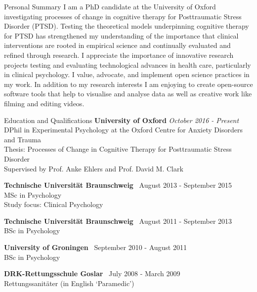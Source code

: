 \documentclass{resume} %
\begin{document}

\begin{rSection}{Personal Summary}
I am a PhD candidate at the University of Oxford investigating processes of change in cognitive therapy for Posttraumatic Stress Disorder (PTSD).
Testing the theoretical models underpinning cognitive therapy for PTSD has strengthened my understanding of the importance that clinical interventions are rooted in empirical science and continually evaluated and refined through research.
I appreciate the importance of innovative research projects testing and evaluating technological advances in health care, particularly in clinical psychology.
I value, advocate, and implement open science practices in my work.
In addition to my research interests I am enjoying to create open-source software tools that help to visualise and analyse data as well as creative work like filming and editing videos.

\end{rSection}


\begin{rSection}{Education and Qualifications}
{\bf University of Oxford} \hfill {\em October 2016 - Present} \\ 
DPhil in Experimental Psychology at the Oxford Centre for Anxiety Disorders and Trauma \smallskip \\
Thesis: Processes of Change in Cognitive Therapy for Posttraumatic Stress Disorder \\
Supervised by Prof. Anke Ehlers and Prof. David M. Clark \smallskip

{\bf Technische Universit{\"a}t Braunschweig} \hfill {\ August 2013 - September 2015} \\ 
MSc in Psychology \\
Study  focus: Clinical Psychology \smallskip

{\bf Technische Universit{\"a}t Braunschweig} \hfill {\ August 2011 - September 2013} \\ 
BSc in Psychology \smallskip

{\bf University of Groningen} \hfill {\ September 2010 - August 2011} \\ 
BSc in Psychology \smallskip

{\bf DRK-Rettungsschule Goslar} \hfill {\ July 2008 - March 2009} \\ 
Rettungssanit{\"a}ter (in English `Paramedic') \smallskip

\end{rSection}
\end{document}
